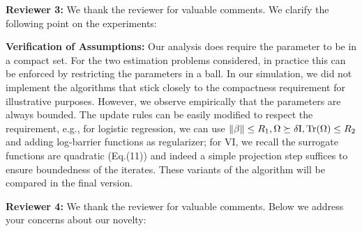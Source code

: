 \documentclass{article}
\begin{document}
\textbf{\textcolor{yellow!50!black}{Reviewer 3:}} We thank the reviewer for valuable comments. We clarify the following point on the experiments:\vspace{-5pt}

\textbf{Verification of Assumptions:} 
Our analysis does require the parameter to be in a compact set.
For the two estimation problems considered, in practice this can be enforced by restricting the parameters in a ball. 
In our simulation, we did not implement the algorithms that stick closely to the compactness requirement for illustrative purposes. However, we observe empirically that the parameters are always bounded.
The update rules can be easily modified to respect the requirement, e.g., for logistic regression, we can use $\|\beta\| \leq R_1, \Omega \succeq \delta {\rm I}, {\rm Tr}(\Omega) \leq R_2$ and adding log-barrier functions as regularizer; for VI, we recall the surrogate functions are quadratic (Eq.(11)) and indeed a simple projection step suffices to ensure boundedness of the iterates.
These variants of the algorithm will be compared in the final version.








\textbf{\textcolor{green!50!black}{Reviewer 4:}} We thank the reviewer for valuable comments. Below we address your concerns about our novelty:\vspace{-5pt}
\end{document}
